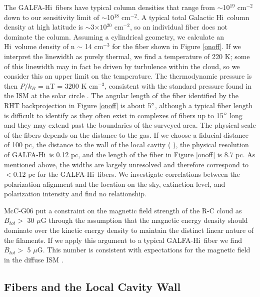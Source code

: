 \documentclass[12pt]{emulateapj}
\newcommand{\hi}{H{\sc i}~}
\newcommand{\citei}[1]{\citeauthor{#1} \citeyear{#1}}
\begin{document}
The GALFA-\hi fibers have typical column densities that range from $\sim$10${^{19}}$ cm${^{-2}}$ down to our sensitivity limit of $\sim$10${^{18}}$ cm${^{-2}}$. A typical total Galactic \hi column density at high latitude is $\sim$3$\times 10{^{20}}$ cm${^{-2}}$, so an individual fiber does not dominate the column. Assuming a cylindrical geometry, we calculate an \hi volume density of n $\sim$ 14 cm$^{-3}$ for the fiber shown in Figure \ref{onoff}. 
If we interpret the linewidth as purely thermal, we find a temperature of 220 K; some of this linewidth may in fact be driven by turbulence within the cloud, so we consider this an upper limit on the temperature. The thermodynamic pressure is then $P/k_B$ = nT = $3200$ K cm$^{-3}$, consistent with the standard pressure found in the ISM at the solar circle \citep{Wolfire2003}. The angular length of the fiber identified by the RHT backprojection in Figure \ref{onoff} is about 5${\degree}$, although a typical fiber length is difficult to identify as they often exist in complexes of fibers up to 15${\degree}$ long and they may extend past the boundaries of the surveyed area. The physical scale of the fibers depends on the distance to the gas. If we choose a fiducial distance of 100 pc, the distance to the wall of the local cavity (\citei{Sfeir:1999tz}), the physical resolution of GALFA-\hi is 0.12 pc, and the length of the fiber in Figure \ref{onoff} is 8.7 pc.  As mentioned above, the widths are largely unresolved and therefore correspond to $<0.12$ pc for the GALFA-\hi fibers.  We investigate correlations between the polarization alignment and the location on the sky, extinction level, and polarization intensity and find no relationship. 

McC-G06 put a constraint on the magnetic field strength of the R-C cloud as $B_{tot} >$ 30 $\mu$G through the assumption that the magnetic energy density should dominate over the kinetic energy density to maintain the distinct linear nature of the filaments. If we apply this argument to a typical GALFA-\hi fiber we find ${B_{tot}} >$ 5 ${\mu}$G. This number is consistent with expectations for the magnetic field in the diffuse ISM \citep{Heiles:2005tb}. 

\subsection{Fibers and the Local Cavity Wall}\label{lcwall}
\end{document}
